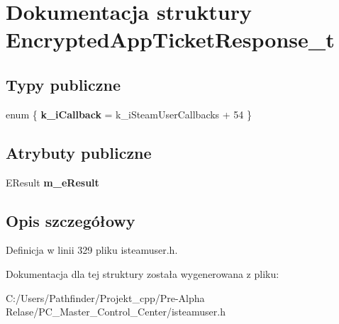 \hypertarget{struct_encrypted_app_ticket_response__t}{}\section{Dokumentacja struktury Encrypted\+App\+Ticket\+Response\+\_\+t}
\label{struct_encrypted_app_ticket_response__t}
\subsection*{Typy publiczne}
\begin{DoxyCompactItemize}
\item 
\mbox{\label{struct_encrypted_app_ticket_response__t_ab0eeb40dbf9e2b7c76db5239f2a17521}} 
enum \{ {\bfseries k\+\_\+i\+Callback} = k\+\_\+i\+Steam\+User\+Callbacks + 54
 \}
\end{DoxyCompactItemize}
\subsection*{Atrybuty publiczne}
\begin{DoxyCompactItemize}
\item 
\mbox{\label{struct_encrypted_app_ticket_response__t_a5bff1bf8e04c0d9d61277d1bd4da52b8}} 
E\+Result {\bfseries m\+\_\+e\+Result}
\end{DoxyCompactItemize}


\subsection{Opis szczegółowy}


Definicja w linii 329 pliku isteamuser.\+h.



Dokumentacja dla tej struktury została wygenerowana z pliku\+:\begin{DoxyCompactItemize}
\item 
C\+:/\+Users/\+Pathfinder/\+Projekt\+\_\+cpp/\+Pre-\/\+Alpha Relase/\+P\+C\+\_\+\+Master\+\_\+\+Control\+\_\+\+Center/isteamuser.\+h\end{DoxyCompactItemize}
